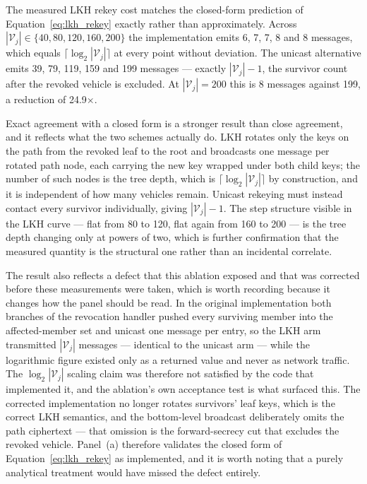 \documentclass[12pt, a4paper]{report}
\begin{document}
The measured LKH rekey cost matches the closed-form prediction of
Equation~\ref{eq:lkh_rekey} exactly rather than approximately. Across
$|\mathcal{V}_j| \in \{40, 80, 120, 160, 200\}$ the implementation emits
6, 7, 7, 8 and 8 messages, which equals $\lceil \log_2 |\mathcal{V}_j|
\rceil$ at every point without deviation. The unicast alternative emits
39, 79, 119, 159 and 199 messages --- exactly $|\mathcal{V}_j| - 1$, the
survivor count after the revoked vehicle is excluded. At
$|\mathcal{V}_j| = 200$ this is 8 messages against 199, a reduction of
24.9$\times$.

Exact agreement with a closed form is a stronger result than close
agreement, and it reflects what the two schemes actually do. LKH rotates
only the keys on the path from the revoked leaf to the root and
broadcasts one message per rotated path node, each carrying the new key
wrapped under both child keys; the number of such nodes is the tree
depth, which is $\lceil \log_2 |\mathcal{V}_j| \rceil$ by construction,
and it is independent of how many vehicles remain. Unicast rekeying must
instead contact every survivor individually, giving $|\mathcal{V}_j| -
1$. The step structure visible in the LKH curve --- flat from 80 to 120,
flat again from 160 to 200 --- is the tree depth changing only at powers
of two, which is further confirmation that the measured quantity is the
structural one rather than an incidental correlate.

The result also reflects a defect that this ablation exposed and that
was corrected before these measurements were taken, which is worth
recording because it changes how the panel should be read. In the
original implementation both branches of the revocation handler pushed
every surviving member into the affected-member set and unicast one
message per entry, so the LKH arm transmitted $|\mathcal{V}_j|$ messages
--- identical to the unicast arm --- while the logarithmic figure existed
only as a returned value and never as network traffic. The
$\log_2|\mathcal{V}_j|$ scaling claim was therefore not satisfied by the
code that implemented it, and the ablation's own acceptance test is what
surfaced this. The corrected implementation no longer rotates survivors'
leaf keys, which is the correct LKH semantics, and the bottom-level
broadcast deliberately omits the path ciphertext --- that omission is the
forward-secrecy cut that excludes the revoked vehicle. Panel~(a)
therefore validates the closed form of Equation~\ref{eq:lkh_rekey} as
implemented, and it is worth noting that a purely analytical treatment
would have missed the defect entirely.
\end{document}
